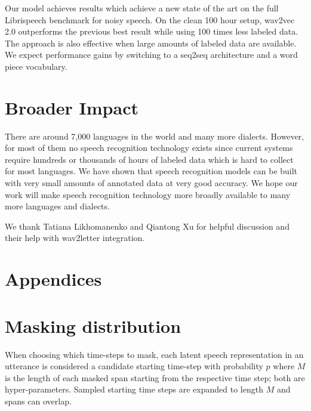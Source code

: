 \documentclass{article}
\begin{document}
Our model achieves results which achieve a new state of the art on the full Librispeech benchmark for noisy speech.
On the clean 100 hour \libri{} setup, wav2vec 2.0 outperforms the previous best result while using 100 times less labeled data.
The approach is also effective when large amounts of labeled data are available. 
We expect performance gains by switching to a seq2seq architecture and a word piece vocabulary.



\section*{Broader Impact}

There are around 7,000 languages in the world and many more dialects. 
However, for most of them no speech recognition technology exists since current systems require hundreds or thousands of hours of labeled data which is hard to collect for most languages.
We have shown that speech recognition models can be built with very small amounts of annotated data at very good accuracy.
We hope our work will make speech recognition technology more broadly available to many more languages and dialects.

\begin{ack}
We thank Tatiana Likhomanenko and Qiantong Xu for helpful discussion and their help with wav2letter integration.

\end{ack}




% 




\newpage

\appendix
\renewcommand{\thesection}{\Alph{section}}


\section*{Appendices}

\section{Masking distribution}
\label{app:masking}

When choosing which time-steps to mask, each latent speech representation in an utterance is considered a candidate starting time-step with probability $p$ where $M$ is the length of each masked span starting from the respective time step; both are hyper-parameters.
Sampled starting time steps are expanded to length $M$ and spans can overlap.
\end{document}
